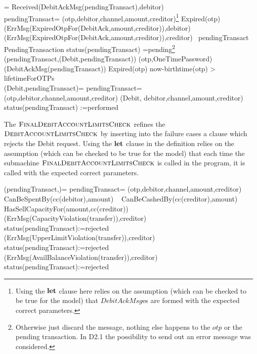 \begin{asm}  
 =\+           
\IF Received(DebitAckMsg(pendingTransact),\FROM debitor) \THEN \\
 \LET pendingTransact= (otp,debitor,channel,amount,creditor)\footnote{Using the $\mathrel{\mathbf{let}}$ clause here relies on the assumption (which can be checked to be true for the model) that $DebitAckMsg$es are formed with the expected correct parameters.}\+
  \IF Expired(otp) \THEN \+
    (ErrMsg(ExpiredOtpFor(DebitAck,amount,creditor)),\TO debitor) \\
    (ErrMsg(ExpiredOtpFor(DebitAck,amount,creditor)),\TO creditor)\- 
  \ELSE ~\IF pendingTransact  \in PendingTransaction \AND
    status(pendingTransact) =pending\footnote{Otherwise just discard the message, nothing else happens to the $otp$ or the pending transaction. In D2.1 the possibility to send out an error message was considered.}  \+
       \THEN \+
          \+
              ~~~~~~ (pendingTransact,(Debit,pendingTransact))\-
                (otp,OneTimePassword)\dec\dec\-  
(DebitAckMsg(pendingTransact)) \dec\-
\WHERE \+
Expired(otp) \IFF now-birthtime(otp) > lifetimeForOTPs\\
(Debit,pendingTransact)=\+
  \LET pendingTransact=(otp,debitor,channel,amount,creditor)\+
  (Debit, debitor,channel,amount,creditor)\\
  status(pendingTransact) :=performed
\end{asm}

The $\hbox{\sc FinalDebitAccountLimitsCheck}$ refines the  $\hbox{\sc DebitAccountLimitsCheck}$ by inserting into the failure cases a clause which rejects the Debit request. Using the $\mathrel{\mathbf{let}}$ clause in the definition relies on the assumption (which can be checked to be true for the model) that each time the submachine $\hbox{\sc FinalDebitAccountLimitsCheck}$ is called in the program, it is called with the expected correct parameters.

\begin{asm}
(pendingTransact,)=\+
  \LET pendingTransact= (otp,debitor,channel,amount,creditor)\\
  \IF CanBeSpentBy(cc(debitor),amount) \+
    \THEN ~ \IF CanBeCashedBy(cc(creditor),amount) \+
      \THEN ~ \IF HasSellCapacityFor(amount,cc(creditor)) \+
         \THEN ~  \\
         \ELSE \+
           (ErrMsg(CapacityViolation(transfer)),\TO creditor)\\
            status(pendingTransact):=rejected \dec\-
     \ELSE \+
    (ErrMsg(UpperLimitViolation(transfer)),\TO creditor)\\
     status(pendingTransact):=rejected \dec\-
  \ELSE \+
   (ErrMsg(AvailBalanceViolation(transfer)),\TO creditor)\\
  status(pendingTransact):=rejected
\end{asm}


